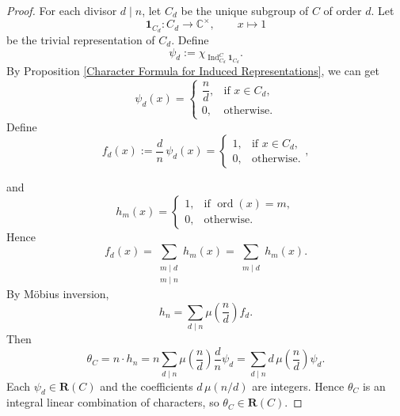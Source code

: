 \begin{proof}
For each divisor \( d \mid n \), let \( C_d \) be the unique subgroup of \( C \) of order \( d \). Let
\[
\mathbf{1}_{C_d} : C_d \to \mathbb{C}^\times, \qquad x\mapsto1
\]
be the trivial representation of \( C_d \). Define
\[
\psi_d := \chi_{\operatorname{Ind}_{C_d}^{C} \mathbf{1}_{C_d}}.
\]
By Proposition \ref{Character Formula for Induced Representations}, we can get
\[
\psi_d(x) =
\begin{cases}
\dfrac{n}{d}, & \text{if } x \in C_d,\\[6pt]
0, & \text{otherwise}.
\end{cases}
\]
Define
\[
f_d (x):= \frac{d}{n} \, \psi_d (x)=
\begin{cases}
1, & \text{if } x \in C_d,\\
0, & \text{otherwise}.
\end{cases},
\]

and
\[
h_m(x) =
\begin{cases}
1, & \text{if } \operatorname{ord}(x) = m,\\
0, & \text{otherwise}.
\end{cases}
\]
Hence
\[
f_d(x) = \sum_{\substack{m \mid d \\ m \mid n}} h_m(x)=\sum_{\substack{m \mid d}} h_m(x).
\]
By Möbius inversion,
\[
h_n = \sum_{d \mid n} \mu\!\left( \frac{n}{d} \right) f_d.
\]
Then
\[
\theta_C= n \cdot h_n
= n \sum_{d \mid n} \mu\!\left( \frac{n}{d} \right) \frac{d}{n} \psi_d
= \sum_{d \mid n} d \, \mu\!\left( \frac{n}{d} \right) \psi_d.
\]
Each \( \psi_d\in \mathbf R(C) \) and the coefficients \( d \, \mu(n/d) \) are integers. Hence \( \theta_C \) is an integral linear combination of characters, so \( \theta_C \in \mathbf{R}(C) \).
\end{proof}

